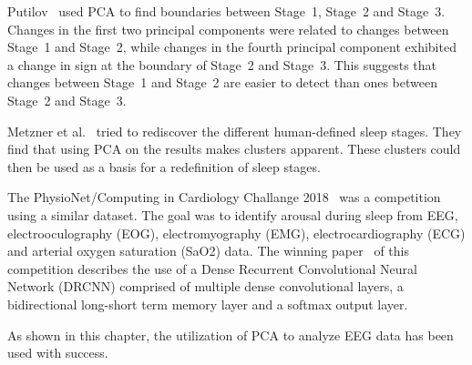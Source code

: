 Putilov~\cite{Putilov2015} used PCA to find boundaries between Stage~1, Stage~2 and Stage~3. Changes in the first two principal components were related to changes between Stage~1 and Stage~2, while changes in the fourth principal component exhibited a change in sign at the boundary of Stage~2 and Stage~3. This suggests that changes between Stage~1 and Stage~2 are easier to detect than ones between Stage~2 and Stage~3.

Metzner et al.~\cite{Metzner2023} tried to rediscover the different human-defined sleep stages. They find that using PCA on the results makes clusters apparent. These clusters could then be used as a basis for a redefinition of sleep stages.

The PhysioNet/Computing in Cardiology Challange 2018~\cite{Ghassemi2018} was a competition using a similar dataset. The goal was to identify arousal during sleep from \color{change} EEG, electrooculography (EOG), electromyography (EMG), electrocardiography (ECG) and arterial oxygen saturation (SaO2) data. \color{black} The winning paper~\cite{Howe2018} of this competition describes the use of a Dense Recurrent Convolutional Neural Network (DRCNN) comprised of multiple dense convolutional layers, a bidirectional long-short term memory layer and a softmax output layer.

As shown in this chapter, the utilization of PCA to analyze EEG data has been used with success.
